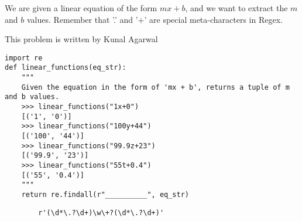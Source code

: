 \begin{blocksection}
\question We are given a linear equation of the form $mx+b$, and we want to extract the $m$ and $b$ values. Remember that '.' and '+' are special meta-characters in Regex.

This problem is written by Kunal Agarwal

\begin{lstlisting}
import re
def linear_functions(eq_str):
    """
    Given the equation in the form of 'mx + b', returns a tuple of m and b values.
    >>> linear_functions("1x+0")
    [('1', '0')]
    >>> linear_functions("100y+44")
    [('100', '44')]
    >>> linear_functions("99.9z+23")
    [('99.9', '23')]
    >>> linear_functions("55t+0.4")
    [('55', '0.4')]
    """
    return re.findall(r"__________", eq_str)
\end{lstlisting}

\begin{solution}[2in]
    \begin{lstlisting}
        r'(\d*\.?\d+)\w\+?(\d*\.?\d+)'
    \end{lstlisting}
\end{solution}
\end{blocksection}
    

